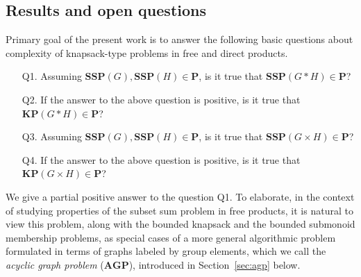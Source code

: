 \documentclass[10pt]{amsart}
\theoremstyle{definition}
\def\P{{\mathbf{P}}}
\def\SSP{{\mathbf{SSP}}}
\def\KP{{\mathbf{KP}}}
\def\AGP{{\mathbf{AGP}}}
\begin{document}
\subsection{Results and open questions}\label{sub:results}
Primary goal of the present work is to answer the following basic questions about complexity of knapsack-type problems in free and direct products.
\begin{itemize}
\item[Q1.] Assuming $\SSP(G),\SSP(H)\in\P$, is it true that $\SSP(G*H)\in\P$?
\item[Q2.] If the answer to the above question is positive, is it true that $\KP(G*H)\in\P$?
\item[Q3.] Assuming $\SSP(G),\SSP(H)\in\P$, is it true that $\SSP(G\times H)\in\P$?
\item[Q4.] If the answer to the above question is positive, is it true that $\KP(G\times H)\in\P$?
\end{itemize}

We give a partial positive answer to the question Q1. To elaborate, in the context of studying properties of the subset sum problem in free products, it is natural to view this problem, along with the bounded knapsack and the bounded submonoid membership problems,
as special cases of a more general algorithmic problem formulated in terms of graphs labeled by group elements, which we call the {\em acyclic graph problem} ($\AGP$), introduced in Section~\ref{sec:agp} below.
\end{document}
